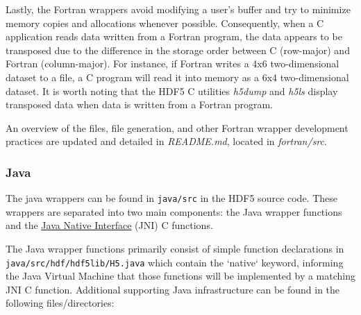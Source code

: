 Lastly, the Fortran wrappers avoid modifying a user's buffer and try to minimize memory copies and allocations whenever possible. Consequently, when a C application reads data written from a Fortran program, the data appears to be transposed due to the difference in the storage order between C (row-major) and Fortran (column-major). For instance, if Fortran writes a 4x6 two-dimensional dataset to a file, a C program will read it into memory as a 6x4 two-dimensional dataset. It is worth noting that the HDF5 C utilities \textit{h5dump} and \textit{h5ls} display transposed data when data is written from a Fortran program. 

An overview of the files, file generation, and other Fortran wrapper development practices are updated and detailed in \textit{README.md}, located in \textit{fortran/src}.

\subsubsection{Java\label{subsec:Java}}

The java wrappers can be found in \texttt{java/src} in the HDF5 source code. These wrappers
are separated into two main components: the Java wrapper functions and the
\href{https://docs.oracle.com/en/java/javase/17/docs/specs/jni/index.html}{Java Native Interface}
(JNI) C functions.

The Java wrapper functions primarily consist of simple function declarations in \\
\texttt{java/src/hdf/hdf5lib/H5.java} which contain the `native` keyword, informing the Java
Virtual Machine that those functions will be implemented by a matching JNI C function.
Additional supporting Java infrastructure can be found in the following files/directories:

